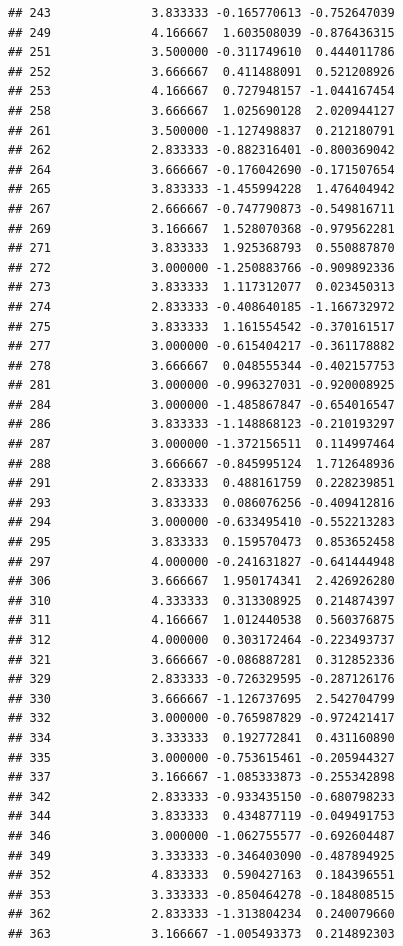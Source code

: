 \documentclass[
]{article}
\begin{document}
\begin{verbatim}
## 243              3.833333 -0.165770613 -0.752647039
## 249              4.166667  1.603508039 -0.876436315
## 251              3.500000 -0.311749610  0.444011786
## 252              3.666667  0.411488091  0.521208926
## 253              4.166667  0.727948157 -1.044167454
## 258              3.666667  1.025690128  2.020944127
## 261              3.500000 -1.127498837  0.212180791
## 262              2.833333 -0.882316401 -0.800369042
## 264              3.666667 -0.176042690 -0.171507654
## 265              3.833333 -1.455994228  1.476404942
## 267              2.666667 -0.747790873 -0.549816711
## 269              3.166667  1.528070368 -0.979562281
## 271              3.833333  1.925368793  0.550887870
## 272              3.000000 -1.250883766 -0.909892336
## 273              3.833333  1.117312077  0.023450313
## 274              2.833333 -0.408640185 -1.166732972
## 275              3.833333  1.161554542 -0.370161517
## 277              3.000000 -0.615404217 -0.361178882
## 278              3.666667  0.048555344 -0.402157753
## 281              3.000000 -0.996327031 -0.920008925
## 284              3.000000 -1.485867847 -0.654016547
## 286              3.833333 -1.148868123 -0.210193297
## 287              3.000000 -1.372156511  0.114997464
## 288              3.666667 -0.845995124  1.712648936
## 291              2.833333  0.488161759  0.228239851
## 293              3.833333  0.086076256 -0.409412816
## 294              3.000000 -0.633495410 -0.552213283
## 295              3.833333  0.159570473  0.853652458
## 297              4.000000 -0.241631827 -0.641444948
## 306              3.666667  1.950174341  2.426926280
## 310              4.333333  0.313308925  0.214874397
## 311              4.166667  1.012440538  0.560376875
## 312              4.000000  0.303172464 -0.223493737
## 321              3.666667 -0.086887281  0.312852336
## 329              2.833333 -0.726329595 -0.287126176
## 330              3.666667 -1.126737695  2.542704799
## 332              3.000000 -0.765987829 -0.972421417
## 334              3.333333  0.192772841  0.431160890
## 335              3.000000 -0.753615461 -0.205944327
## 337              3.166667 -1.085333873 -0.255342898
## 342              2.833333 -0.933435150 -0.680798233
## 344              3.833333  0.434877119 -0.049491753
## 346              3.000000 -1.062755577 -0.692604487
## 349              3.333333 -0.346403090 -0.487894925
## 352              4.833333  0.590427163  0.184396551
## 353              3.333333 -0.850464278 -0.184808515
## 362              2.833333 -1.313804234  0.240079660
## 363              3.166667 -1.005493373  0.214892303

\end{verbatim}
\end{document}

